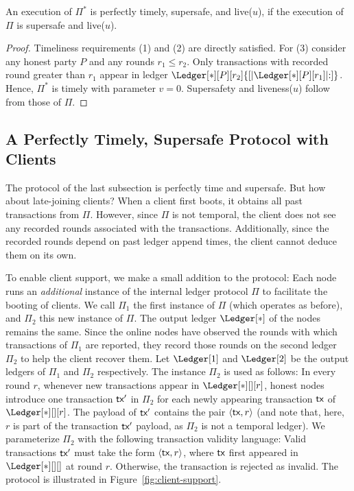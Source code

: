 \begin{theorem} \label{thm:backward-reduction}
  An execution of $\Pi^*$ is perfectly timely, supersafe, and live($u$), if the execution of
  $\Pi$ is supersafe and live($u$).
\end{theorem}
\begin{proof}
  Timeliness requirements (1) and (2) are directly satisfied.
  For (3) consider any honest party $P$ and any rounds $r_1 \leq r_2$.
  Only transactions with recorded round greater
  than $r_1$ appear in ledger $\Ledger[*][P][r_2]{[|\Ledger[*][P][r_1]|{:}]}$.
  Hence, $\Pi^*$ is timely with parameter $v = 0$.
  Supersafety and liveness($u$) follow from those of $\Pi$.
  \Qed
\end{proof}

\subsection{A Perfectly Timely, Supersafe Protocol with Clients}

The protocol of the last subsection is perfectly time and supersafe.
But how about late-joining clients?
When a client first boots, it obtains all past transactions
from $\Pi$.
However, since $\Pi$ is not temporal, the client does not see any recorded rounds
associated with the transactions. Additionally, since the recorded rounds depend
on past ledger append times, the client cannot deduce them on its own.

To enable client support, we make a small addition to the protocol:
Each node runs an \emph{additional} instance of the internal
ledger protocol $\Pi$
to facilitate the booting of clients.
We call $\Pi_1$ the first instance of $\Pi$
(which operates as before),
and $\Pi_2$ this new instance of $\Pi$.
The output ledger $\Ledger[*]$ of the nodes remains the same.
Since the online nodes have observed the rounds with which
transactions of $\Pi_1$ are reported, they record those
rounds on the second ledger $\Pi_2$ to help the client
recover them.
Let $\Ledger[1]$ and $\Ledger[2]$ be the output ledgers
of $\Pi_1$ and $\Pi_2$ respectively.
The instance $\Pi_2$ is used as follows:
In every round $r$,
whenever new transactions appear in $\Ledger[*][][r]$,
honest nodes introduce one transaction $\textsf{tx}'$ in $\Pi_2$
for each newly appearing transaction $\textsf{tx}$ of $\Ledger[*][][r]$.
The payload of $\textsf{tx}'$ contains the pair $\left<\textsf{tx}, r\right>$
(and note that, here, $r$ is part of the transaction $\textsf{tx}'$ payload,
as $\Pi_2$ is not a temporal ledger).
We parameterize $\Pi_2$ with the following transaction validity language:
Valid transactions $\textsf{tx}'$ must take the form $\left<\textsf{tx}, r\right>$,
where $\textsf{tx}$ first appeared in $\Ledger[*][][]$ at round $r$.
Otherwise, the transaction is rejected as invalid.
The protocol is illustrated in Figure~\ref{fig:client-support}.

